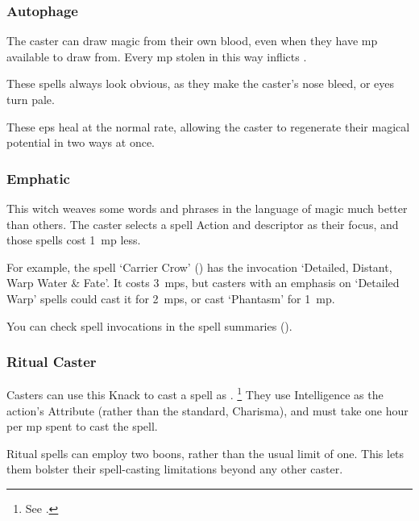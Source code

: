 \begin{multicols}{2}


\subsubsection{Autophage}

The caster can draw magic from their own blood, even when they have \gls{mp} available to draw from.
Every \gls{mp} stolen in this way inflicts .

These spells always look obvious, as they make the caster's nose bleed, or eyes turn pale.

These \glspl{ep} heal at the normal rate, allowing the caster to regenerate their magical potential in two ways at once.

\subsubsection{Emphatic}
\label{emphaticCaster}

This \gls{witch} weaves some words and phrases in the language of magic much better than others.
The caster selects a spell Action and \gls{descriptor} as their focus, and those spells cost 1~\gls{mp} less.

For example, the spell `Carrier Crow' () has the invocation `Detailed, Distant, Warp Water \& Fate'.
It costs 3~\glspl{mp}, but casters with an emphasis on `Detailed Warp' spells could cast it for 2~\glspl{mp}, or cast `Phantasm' for 1~\gls{mp}.

You can check spell \glspl{invocation} in the spell summaries ().

\subsubsection{Ritual Caster}
\label{ritualCaster}

Casters can use this Knack to cast a spell as .%
\footnote{See .}
They use Intelligence as the action's Attribute (rather than the standard, Charisma), and must take one hour per \gls{mp} spent to cast the spell.

Ritual spells can employ two \glspl{boon}, rather than the usual limit of one.
This lets them bolster their spell-casting limitations beyond any other caster.


\end{multicols}
